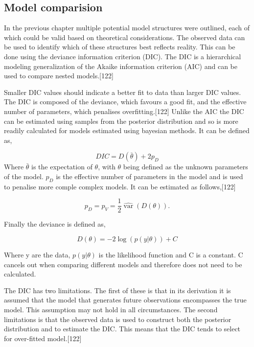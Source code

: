 \documentclass[11pt,twoside]{bristolthesis}
\begin{document}
  \hypertarget{model-comparision}{%
  \subsection{Model comparision}\label{model-comparision}}
  
  In the previous chapter multiple potential model structures were outlined, each of which could be valid based on theoretical considerations. The observed data can be used to identify which of these structures best reflects reality. This can be done using the deviance information criterion (DIC). The DIC is a hierarchical modeling generalization of the Akaike information criterion (AIC) and can be used to compare nested models.{[}122{]}
  
  Smaller DIC values should indicate a better fit to data than larger DIC values. The DIC is composed of the deviance, which favours a good fit, and the effective number of parameters, which penalises overfitting.{[}122{]} Unlike the AIC the DIC can be estimated using samples from the posterior distribution and so is more readily calculated for models estimated using bayesian methods. It can be defined as,
  
  \[ {\mathit  {DIC}}=D({\bar  {\theta }})+2p_{D}\]
  Where \(\bar{\theta}\) is the expectation of \(\theta\), with \(\theta\) being defined as the unknown parameters of the model. \(p_{D}\) is the effective number of parameters in the model and is used to penalise more comple complex models. It can be estimated as follows,{[}122{]}
  
  \[p_{D}=p_{V}={\frac  {1}{2}}\widehat {\operatorname {var}}\left(D(\theta )\right).\]
  
  Finally the deviance is defined as,
  
  \[D(\theta)=-2\log(p(y|\theta ))+C\]
  
  Where y are the data, \(\displaystyle p(y|\theta)\) is the likelihood function and C is a constant. C cancels out when comparing different models and therefore does not need to be calculated.
  
  The DIC has two limitations. The first of these is that in its derivation it is assumed that the model that generates future observations encompasses the true model. This assumption may not hold in all circumstances. The second limitations is that the observed data is used to construct both the posterior distribution and to estimate the DIC. This means that the DIC tends to select for over-fitted model.{[}122{]}
  
\end{document}
